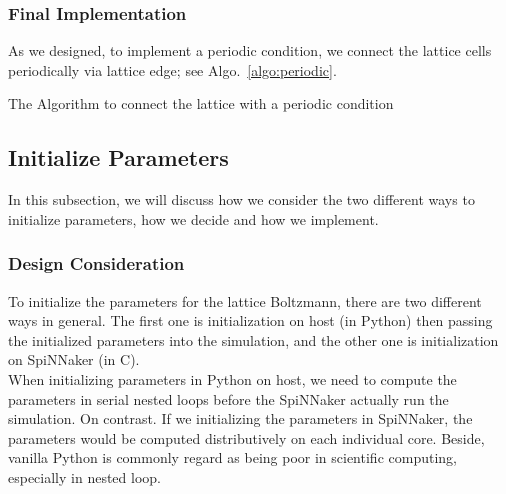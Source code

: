 \subsubsection{Final Implementation}
As we designed, to implement a periodic condition, we connect the lattice cells periodically via lattice edge; see Algo.~\ref{algo:periodic}.\\

\begin{algorithm}
 \caption{The Algorithm to connect the lattice with a periodic condition}
 \label{algo:periodic}
\end{algorithm}




\subsection{Initialize Parameters} \label{sec:ip}
In this subsection, we will discuss how we consider the two different ways to initialize parameters, how we decide and how we implement.\\
\subsubsection{Design Consideration}
To initialize the parameters for the lattice Boltzmann, there are two different ways in general. The first one is initialization on host (in Python) then passing the initialized parameters into the simulation, and the other one is initialization on SpiNNaker (in C).\\

When initializing parameters in Python on host, we need to compute the parameters in serial nested loops before the SpiNNaker actually run the simulation. On contrast. If we initializing the parameters in SpiNNaker, the parameters would be computed distributively on each individual core. Beside, vanilla Python is commonly regard as being poor in scientific computing, especially in nested loop.\\

